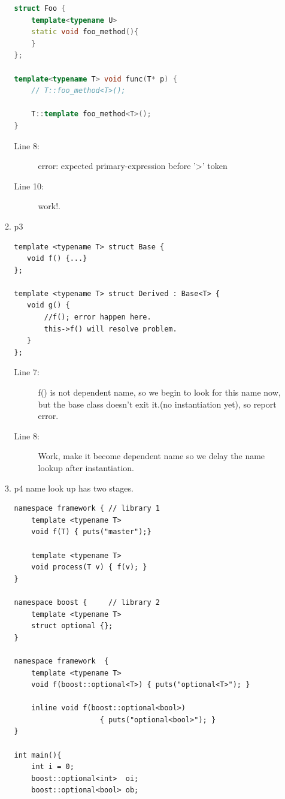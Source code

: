\documentclass[a4paper,11pt,twoside]{book}
\begin{document}
\begin{itemize}
\begin{enumerate}
\begin{lstlisting}[frame=single, language=c++]
struct Foo {
	template<typename U>
	static void foo_method(){
	}
};

template<typename T> void func(T* p) {
	// T::foo_method<T>();
	
	T::template foo_method<T>();
}
\end{lstlisting}
\begin{description}
	\item[Line 8:] error: expected primary-expression before '>' token
	\item[Line 10:] work!. 
\end{description}

\item p3
\begin{lstlisting}[numbers=none]
template <typename T> struct Base {
   void f() {...}
};

template <typename T> struct Derived : Base<T> {
   void g() {
       //f(); error happen here. 
       this->f() will resolve problem.
   }
};
\end{lstlisting}
\begin{description}
	\item[Line 7:] f() is not dependent name, so we begin to look for this name now, but the base class doesn't exit it.(no instantiation yet), so report error.
	
	\item[Line 8:] Work, make it become dependent name so we delay the name lookup after instantiation.
\end{description}


\item p4 name look up has two stages. 

\begin{lstlisting}[numbers=none]
namespace framework { // library 1
	template <typename T>
	void f(T) { puts("master");}
 
	template <typename T>
	void process(T v) { f(v); }
}
 
namespace boost {     // library 2
	template <typename T>
	struct optional {};
}
 
namespace framework  {     
	template <typename T>
	void f(boost::optional<T>) { puts("optional<T>"); }
    
	inline void f(boost::optional<bool>) 
	                { puts("optional<bool>"); }
}
 
int main(){
	int i = 0;
	boost::optional<int>  oi;
	boost::optional<bool> ob;
  

\end{lstlisting}
\end{enumerate}
\end{itemize}
\end{document}
